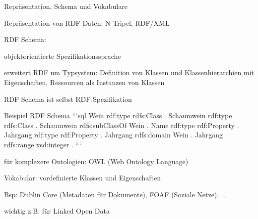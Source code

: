 \documentclass[a4paper]{article}
\begin{document}
\begin{multicols}{3}
\begin{itemize*}
        Repräsentation, Schema und Vokabulare
        \begin{itemize*}
            \item Repräsentation von RDF-Daten: N-Tripel, RDF/XML
            \item RDF Schema:
            \begin{itemize*}
                \item objektorientierte Spezifikationssprache
                \item erweitert RDF um Typsystem: Definition von Klassen und Klassenhierarchien mit Eigenschaften, Ressourcen als Instanzen von Klassen
                \item RDF Schema ist selbst RDF-Spezifikation
            \end{itemize*}
            \item Beispiel RDF Schema
            ```sql
            Wein rdf:type rdfs:Class .
            Schaumwein rdf:type rdfs:Class .
            Schaumwein rdfs:subClassOf Wein .
            Name rdf:type rdf:Property .
            Jahrgang rdf:type rdf:Property .
            Jahrgang rdfs:domain Wein .
            Jahrgang rdfs:range xsd:integer .
            ```
            \item für komplexere Ontologien: OWL (Web Ontology Language)
            \item Vokabular: vordefinierte Klassen und Eigenschaften
            \begin{itemize*}
                \item Bsp: Dublin Core (Metadaten für Dokumente), FOAF (Soziale Netze), ...
                \item wichtig z.B. für Linked Open Data
            \end{itemize*}
        \end{itemize*}


\end{itemize*}
\end{multicols}
\end{document}
